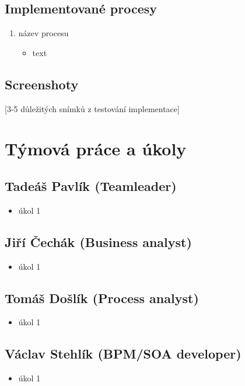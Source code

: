 \documentclass[11pt,a4paper]{article}
\begin{document}
\subsection{Implementované procesy}

\begin{enumerate}
    \item název procesu
    \begin{itemize}
        \item text
    \end{itemize}
\end{enumerate}

\subsection{Screenshoty}

[3-5 důležitých snímků z testování implementace]

\section{Týmová práce a úkoly}

\subsection{Tadeáš Pavlík (Teamleader)}

\begin{itemize}
    \item úkol 1
\end{itemize}

\subsection{Jiří Čechák (Business analyst)}

\begin{itemize}
    \item úkol 1
\end{itemize}

\subsection{Tomáš Došlík (Process analyst)}

\begin{itemize}
    \item úkol 1
\end{itemize}

\subsection{Václav Stehlík (BPM/SOA developer)}

\begin{itemize}
    \item úkol 1
\end{itemize}
\end{document}
